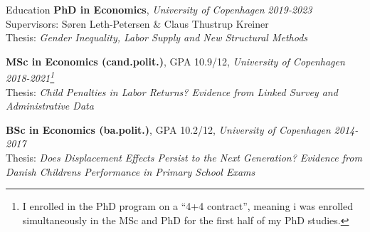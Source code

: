 \documentclass[
	11pt, %
]{resume} %
\begin{document}

\begin{rSection}{Education}
    \textbf{PhD in Economics}, \textit{University of Copenhagen} \hfill \textit{2019-2023} \\
    Supervisors: Søren Leth-Petersen \& Claus Thustrup Kreiner \\
    Thesis: \textit{Gender Inequality, Labor Supply and New Structural Methods}

    \textbf{MSc in Economics (cand.polit.)}, GPA 10.9/12, \textit{University of Copenhagen} \hfill \textit{2018-2021\footnote{I enrolled in the PhD program on a ``4+4 contract'', meaning i was enrolled simultaneously in the MSc and PhD for the first half of my PhD studies.}} \\
    Thesis: \textit{Child Penalties in Labor Returns? Evidence from Linked Survey and Administrative Data}

    \textbf{BSc in Economics (ba.polit.)}, GPA 10.2/12, \textit{University of Copenhagen} \hfill \textit{2014-2017} \\
    Thesis: \textit{Does Displacement Effects Persist to the Next Generation? Evidence from Danish Childrens Performance in Primary School Exams}
\end{rSection}

\end{document}
